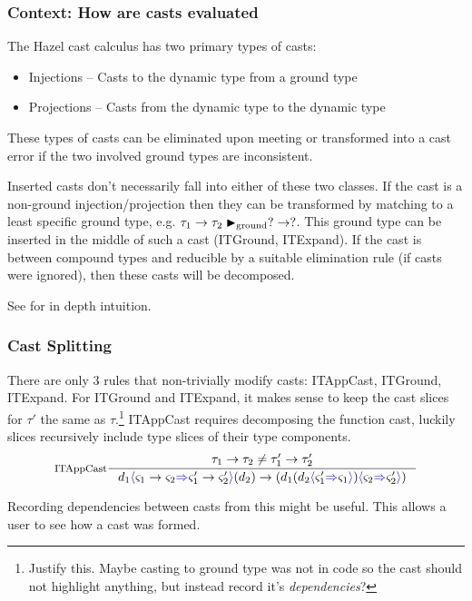 \subsubsection{Context: How are casts evaluated}
The Hazel cast calculus has two primary types of casts:
\begin{itemize}
\item Injections -- Casts to the dynamic type from a ground type
\item Projections -- Casts from the dynamic type to the dynamic type
\end{itemize}
These types of casts can be eliminated upon meeting or transformed into a cast error if the two involved ground types are inconsistent.\par 
Inserted casts don't necessarily fall into either of these two classes. If the cast is a non-ground injection/projection then they can be transformed by matching to a least specific ground type, e.g. $\tau_1 \to \tau_2 \blacktriangleright_{\text{ground}} ? \to ?$. This ground type can be inserted in the middle of such a cast (ITGround, ITExpand). If the cast is between compound types and reducible by a suitable elimination rule (if casts were ignored), then these casts will be decomposed. \par 
See \cite{GradualizerDynamic} for in depth intuition.

\subsubsection{Cast Splitting}
There are only 3 rules that non-trivially modify casts: ITAppCast, ITGround, ITExpand. For ITGround and  ITExpand, it makes sense to keep the cast slices for $\tau'$ the same as $\tau$.\footnote{Justify this. Maybe casting to ground type was not in code so the cast should not highlight anything, but instead record it's \textit{dependencies}?} ITAppCast requires decomposing the function cast, luckily slices recursively include type slices of their  type components.
\[\inference[ITAppCast]{\tau_1 \to \tau_2 \neq \tau_1' \to \tau_2'}{d_1\scast{\varsigma_1 \to \varsigma_2}{\varsigma_1' \to \varsigma_2'}(d_2) \to (d_1(d_2\scast{\varsigma_1'}{\varsigma_1})\scast{\varsigma_2}{\varsigma_2'})}\]

\par 

Recording dependencies between casts from this might be useful. This allows a user to see how a cast was formed.



